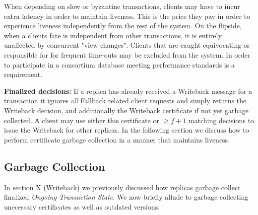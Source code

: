 When depending on slow or byzantine transactions, clients may have to incur extra latency in order to maintain liveness. 
This is the price they pay in order to experience liveness independently from the rest of the system. On the flipside, when a clients fate is independent from other transactions, it is entirely unaffected by concurrent "view-changes". Clients that are caught equivocating or responsible for for frequent time-outs may be excluded from the system. In order to participate in a consortium database meeting performance standards is a requirement.


\textbf{Finalized decisions:} If a replica has already received a Writeback message for a transaction it ignores all Fallback related client requests and simply returns the Writeback decision, and additionally the Writeback certificate if not yet garbage collected. A client may use either this certificate or $\geq f+1$ matching decisions to issue the Writeback for other replicas. In the following section we discuss how to perform certificate garbage collection in a manner that maintains liveness.

\subsection{Garbage Collection}
In section X (Writeback) we previously discussed how replicas garbage collect finalized \textit{Ongoing Transaction State}. 
We now briefly allude to garbage collecting unecessary certificates as well as outdated versions.




